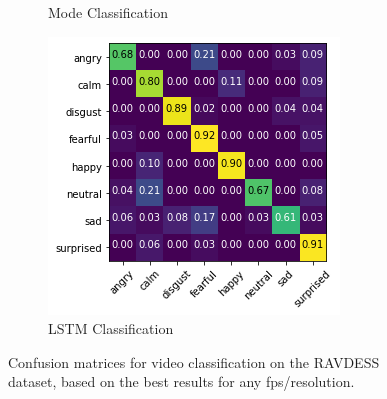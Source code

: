 \documentclass[sigconf]{acmart}
\begin{document}
{\begin{figure}[h]
\begin{subfigure}[b]{0.3\textwidth}
		\caption{Mode Classification}
		\label{fig:video-mode}
	\end{subfigure}
	\hfill
	\begin{subfigure}[b]{0.3\textwidth}
		\includegraphics[width=\textwidth]{images/video-lstm.png}
		\caption{LSTM Classification}
		\label{fig:video-lstm}
	\end{subfigure}
	\caption{Confusion matrices for video classification on the RAVDESS dataset, based on the best results for any fps/resolution.}
	\label{fig:video}
\end{figure}


}
\end{document}
